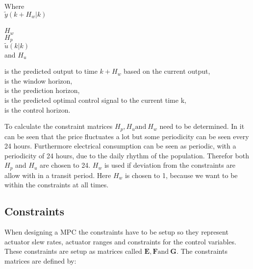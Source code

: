  \begin{minipage}[t]{0.20\textwidth}
 Where\\
 \hspace*{8mm} $\tilde y(k+H_w|k)$ \\
 \textcolor{White}{te} \\
 \hspace*{8mm} $H_w$ \\
 \hspace*{8mm} $H_p$ \\
 \hspace*{8mm} $\tilde u(k|k)$\\
 and \hspace*{0.7mm} $H_u$	
 \end{minipage}
 \begin{minipage}[t]{0.68\textwidth}
 \vspace*{2mm}
 is the predicted output to time $k+H_w$ based on the current output, \\
 is the window horizon,\\
 is the prediction horizon,\\
 is the predicted optimal control signal to the current time k, \\
 is the control horizon.
 \end{minipage}

To calculate the constraint matrices $H_p, H_u \text{and} \: H_w$ need to be determined. In  it can be seen that the price fluctuates a lot but some periodicity can be seen every 24 hours. Furthermore electrical consumption can be seen as periodic, with a periodicity of 24 hours, due to the daily rhythm of the population. Therefor both $H_p$ and $ H_u $ are chosen to 24. $H_w$ is used if deviation from the constraints are allow with in a transit period. Here $H_w$ is chosen to 1, because we want to be within the constraints at all times. 


\subsection{Constraints}

When designing a MPC the constraints have to be setup so they represent actuator slew rates, actuator ranges and constraints for the control variables. These constraints are setup as matrices called $\pmb{E}, \pmb{F} \text{and} \:\pmb{G}$. The constraints matrices are defined by: 

